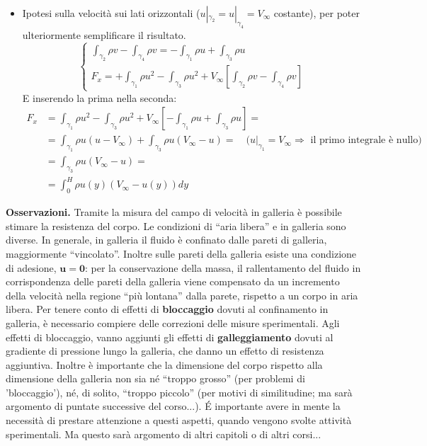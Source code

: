 \begin{itemize}
\item Ipotesi sulla velocità sui lati orizzontali ($u|_{\gamma_2} = u|_{\gamma_4} = V_\infty$ costante), per poter ulteriormente semplificare il risultato.
   \begin{equation}
     \begin{cases}
        \int_{\gamma_2} \rho v  -\int_{\gamma_4} \rho v = -\int_{\gamma_1} \rho u+\int_{\gamma_3} \rho u\\
       F_x = +\int_{\gamma_1} \rho u^2 -\int_{\gamma_3} \rho u^2 + V_\infty \left[ \int_{\gamma_2} \rho v  -\int_{\gamma_4} \rho v \right]
     \end{cases}
  \end{equation}
E inserendo la prima nella seconda:
\begin{equation}
  \begin{aligned}
       F_x  & = \int_{\gamma_1} \rho u^2 -\int_{\gamma_3} \rho u^2 + V_\infty \left[-\int_{\gamma_1} \rho u+\int_{\gamma_3} \rho u \right] = \\
       & = \int_{\gamma_1} \rho u (u-V_\infty) + \int_{\gamma_3} \rho u (V_\infty-u) = \quad \text{($u|_{\gamma_1} = V_\infty  \Rightarrow $ il primo integrale è nullo)} \\
       & = \int_{\gamma_3} \rho u (V_\infty-u) = \\
       & = \int_{0}^{H} \rho u(y) (V_\infty - u(y)) dy
  \end{aligned}
\label{eqn:difetto_scia}
\end{equation}

\end{itemize}

\noindent
\textbf{Osservazioni.} Tramite la misura del campo di velocità in
galleria è possibile stimare la resistenza del corpo.
Le condizioni di ``aria libera'' e in galleria sono diverse. In generale, in galleria il fluido è confinato dalle pareti di galleria, maggiormente ``vincolato''. Inoltre sulle pareti della galleria esiste una condizione di adesione, $\bm{u}=\bm{0}$: per la conservazione della massa, il rallentamento del fluido in corrispondenza delle pareti della galleria viene compensato da un incremento della velocità nella regione ``più lontana'' dalla parete, rispetto a un corpo in aria libera.
 Per tenere conto di effetti di 
\textbf{bloccaggio} dovuti al confinamento in galleria, è necessario compiere delle correzioni delle misure sperimentali.
Agli effetti di bloccaggio, vanno aggiunti gli effetti di \textbf{galleggiamento} dovuti al gradiente di pressione lungo la galleria, che danno un effetto di resistenza aggiuntiva.
Inoltre è importante che la dimensione del corpo rispetto alla dimensione della galleria non sia né ``troppo grosso'' (per problemi di 'bloccaggio'), né, di solito, ``troppo piccolo'' (per motivi di similitudine; ma sarà argomento di puntate successive del corso...). \'E importante avere in mente la necessità di prestare attenzione a questi aspetti, quando vengono svolte attività sperimentali. Ma questo sarà argomento di altri capitoli o di altri corsi...


